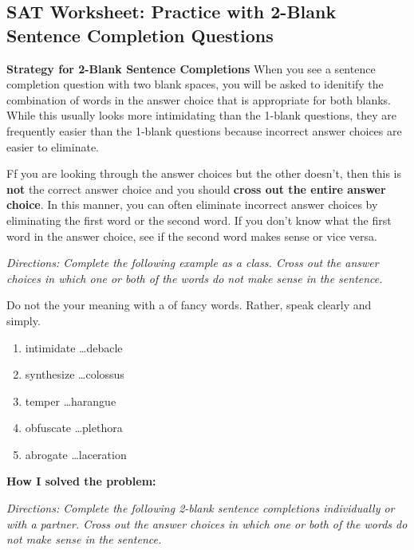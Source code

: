 \subsection{SAT Worksheet: Practice with 2-Blank Sentence Completion Questions}
 
\textbf{Strategy for 2-Blank Sentence Completions}
When you see a sentence completion question with two blank spaces, you will be asked to idenitify the combination of words in the answer choice that is appropriate for both blanks. While this usually looks more intimidating than the 1-blank questions, they are frequently easier than the 1-blank questions because incorrect answer choices are easier to eliminate.  

Ff you are looking through the answer choices but the other doesn't, then this is \textbf{not} the correct answer choice and you should \textbf{cross out the entire answer choice}. In this manner, you can often eliminate incorrect answer choices by eliminating the first word or the second word. If you don't know what the first word in the answer choice, see if the second word makes sense or vice versa. 

\textit{Directions: Complete the following example as a class. Cross out the answer choices in which one or both of the words do not make sense in the sentence.}

Do not \underline{\hspace{2in}} the your meaning with a \underline{\hspace{2in}} of fancy words. Rather, speak clearly and simply. 

\begin{enumerate} [label=(\Alph*)]
\item intimidate \ldots debacle
\item synthesize \ldots colossus
\item temper \ldots harangue
\item obfuscate \ldots plethora
\item abrogate \ldots laceration
\end{enumerate} 

\large{\textbf{How I solved the problem:}} \hrulefill


\textit{Directions: Complete the following 2-blank sentence completions individually or with a partner. Cross out the answer choices in which one or both of the words do not make sense in the sentence.}

